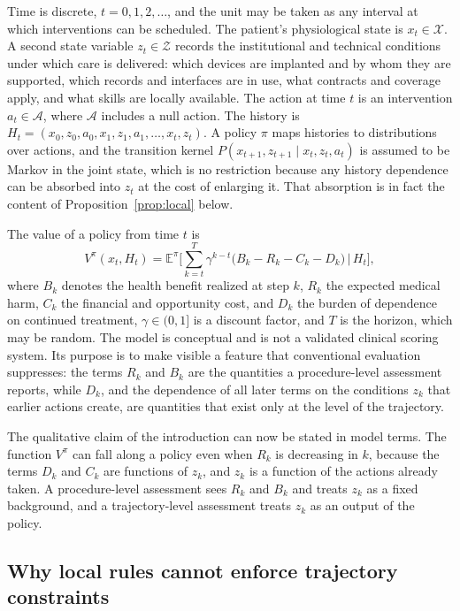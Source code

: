 \documentclass[11pt]{article}
\theoremstyle{plain}
\theoremstyle{definition}
\theoremstyle{remark}
\newcommand{\E}{\mathbb{E}}
\begin{document}
Time is discrete, $t=0,1,2,\dots$, and the unit may be taken as any interval at which interventions can be scheduled. The patient's physiological state is $x_t\in\mathcal X$. A second state variable $z_t\in\mathcal Z$ records the institutional and technical conditions under which care is delivered: which devices are implanted and by whom they are supported, which records and interfaces are in use, what contracts and coverage apply, and what skills are locally available. The action at time $t$ is an intervention $a_t\in\mathcal A$, where $\mathcal A$ includes a null action. The history is $H_t=(x_0,z_0,a_0,x_1,z_1,a_1,\dots,x_t,z_t)$. A policy $\pi$ maps histories to distributions over actions, and the transition kernel $P(x_{t+1},z_{t+1}\mid x_t,z_t,a_t)$ is assumed to be Markov in the joint state, which is no restriction because any history dependence can be absorbed into $z_t$ at the cost of enlarging it. That absorption is in fact the content of Proposition~\ref{prop:local} below.

The value of a policy from time $t$ is
\begin{equation}\label{eq:value}
V^\pi(x_t,H_t)=\E^\pi\Big[\sum_{k=t}^{T}\gamma^{k-t}\big(B_k-R_k-C_k-D_k\big)\,\Big|\,H_t\Big],
\end{equation}
where $B_k$ denotes the health benefit realized at step $k$, $R_k$ the expected medical harm, $C_k$ the financial and opportunity cost, and $D_k$ the burden of dependence on continued treatment, $\gamma\in(0,1]$ is a discount factor, and $T$ is the horizon, which may be random. The model is conceptual and is not a validated clinical scoring system. Its purpose is to make visible a feature that conventional evaluation suppresses: the terms $R_k$ and $B_k$ are the quantities a procedure-level assessment reports, while $D_k$, and the dependence of all later terms on the conditions $z_k$ that earlier actions create, are quantities that exist only at the level of the trajectory.

The qualitative claim of the introduction can now be stated in model terms. The function $V^\pi$ can fall along a policy even when $R_k$ is decreasing in $k$, because the terms $D_k$ and $C_k$ are functions of $z_k$, and $z_k$ is a function of the actions already taken. A procedure-level assessment sees $R_k$ and $B_k$ and treats $z_k$ as a fixed background, and a trajectory-level assessment treats $z_k$ as an output of the policy.

\subsection{Why local rules cannot enforce trajectory constraints}
\end{document}

